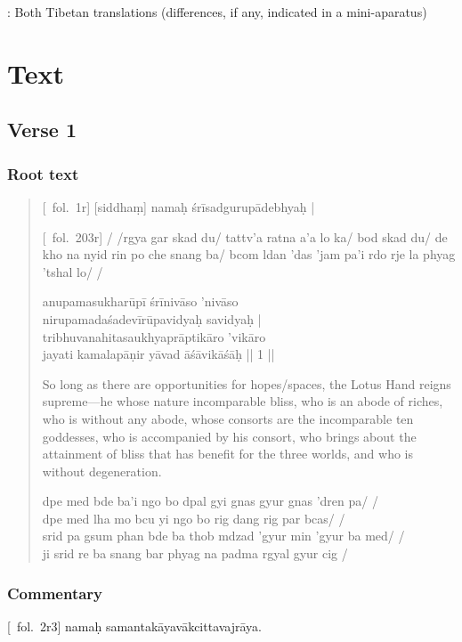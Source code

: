 \documentclass[12pt]{article}
\newcommand{\emdash} {\hspace{0em}—\hspace{0em}}
\begin{document}
\noindent \TIB : Both Tibetan translations (differences, if any, indicated in a mini-aparatus)

\section{Text}
\subsection{Verse 1}
\subsubsection{Root text}
\begin{quote}
	[\MS\ fol.\ 1r] [siddhaṃ]\footnoteB{
		[siddhaṃ]] \MS ; oṁ \EDD
	} namaḥ śrīsadgurupādebhyaḥ |
	
	[\TM\ fol.\ 203r] / /rgya gar skad du/ tattv'a ratna a'a lo ka/ bod skad du/ de kho na nyid rin po che snang ba/ bcom ldan 'das 'jam pa'i rdo rje la phyag 'tshal lo/ /

	anupamasukharūpī śrīnivāso 'nivāso \\
	nirupamadaśadevīrūpavidyaḥ\footnoteB{
		nirupama°] \EDD\ ; nirūpama° \MS
	} savidyaḥ |\\
	tribhuvanahitasaukhyaprāptikāro 'vikāro \\
	jayati kamalapāṇir yāvad āśāvikāśāḥ\footnoteB{
		āśāvikāśāḥ] \corr ; āśāvikāsāḥ \MS\ \EDD
	} || 1 ||
	
	So long as there are opportunities for hopes/spaces, the Lotus Hand reigns supreme\emdash he whose nature incomparable bliss, who is an abode of riches, who is without any abode, whose consorts are the incomparable ten goddesses, who is accompanied by his consort, who brings about the attainment of bliss that has benefit for the three worlds, and who is without degeneration.
	
	dpe med bde ba'i ngo bo dpal gyi gnas gyur gnas 'dren pa/ /\\
	dpe med lha mo bcu yi ngo bo rig dang rig par bcas/ /\\
	srid pa gsum phan bde ba thob mdzad 'gyur min 'gyur ba med/ /\\
	ji srid re ba snang bar phyag na padma rgyal gyur cig /
\end{quote}

\subsubsection{Commentary}
[\MS\ fol.\ 2r3] namaḥ samantakāyavākcittavajrāya.\\
\end{document}
